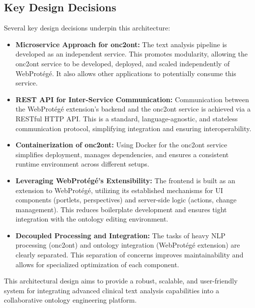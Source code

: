 \subsection{Key Design Decisions}
Several key design decisions underpin this architecture:
\begin{itemize}
    \item \textbf{Microservice Approach for onc2ont:} The text analysis pipeline is developed as an independent service. This promotes modularity, allowing the onc2ont service to be developed, deployed, and scaled independently of WebProtégé. It also allows other applications to potentially consume this service.
    \item \textbf{REST API for Inter-Service Communication:} Communication between the WebProtégé extension's backend and the onc2ont service is achieved via a RESTful HTTP API. This is a standard, language-agnostic, and stateless communication protocol, simplifying integration and ensuring interoperability.
    \item \textbf{Containerization of onc2ont:} Using Docker for the onc2ont service simplifies deployment, manages dependencies, and ensures a consistent runtime environment across different setups.
    \item \textbf{Leveraging WebProtégé's Extensibility:} The frontend is built as an extension to WebProtégé, utilizing its established mechanisms for UI components (portlets, perspectives) and server-side logic (actions, change management). This reduces boilerplate development and ensures tight integration with the ontology editing environment.
    \item \textbf{Decoupled Processing and Integration:} The tasks of heavy NLP processing (onc2ont) and ontology integration (WebProtégé extension) are clearly separated. This separation of concerns improves maintainability and allows for specialized optimization of each component.
\end{itemize}
This architectural design aims to provide a robust, scalable, and user-friendly system for integrating advanced clinical text analysis capabilities into a collaborative ontology engineering platform.

